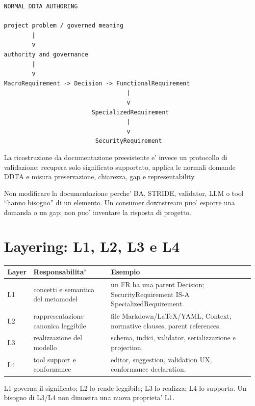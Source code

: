\documentclass[11pt,a4paper]{article}
\begin{document}
\begin{lstlisting}
NORMAL DDTA AUTHORING

project problem / governed meaning
        |
        v
authority and governance
        |
        v
MacroRequirement -> Decision -> FunctionalRequirement
                                   |
                                   v
                         SpecializedRequirement
                                   |
                                   v
                          SecurityRequirement
\end{lstlisting}

La ricostruzione da documentazione preesistente e' invece un protocollo di validazione: recupera solo significato supportato, applica le normali domande DDTA e misura preservazione, chiarezza, gap e representability.

\begin{ddtaanti}[title={Authority inversion}]
Non modificare la documentazione perche' BA, STRIDE, validator, LLM o tool ``hanno bisogno'' di un elemento. Un consumer downstream puo' esporre una domanda o un gap; non puo' inventare la risposta di progetto.
\end{ddtaanti}

\section{Layering: L1, L2, L3 e L4}
\closedtag

\begin{tabularx}{\textwidth}{L{14mm}L{42mm}Y}
\toprule
\textbf{Layer} & \textbf{Responsabilita'} & \textbf{Esempio} \\
\midrule
L1 & concetti e semantica del metamodel & un FR ha una parent Decision; SecurityRequirement IS-A SpecializedRequirement. \\
L2 & rappresentazione canonica leggibile & file Markdown/LaTeX/YAML, Context, normative clauses, parent references. \\
L3 & realizzazione del modello & schema, indici, validator, serializzazione e projection. \\
L4 & tool support e conformance & editor, suggestion, validation UX, conformance declaration. \\
\bottomrule
\end{tabularx}

\begin{ddtacore}[title={Direzione}]
L1 governa il significato; L2 lo rende leggibile; L3 lo realizza; L4 lo supporta. Un bisogno di L3/L4 non dimostra una nuova proprieta' L1.
\end{ddtacore}
\end{document}
